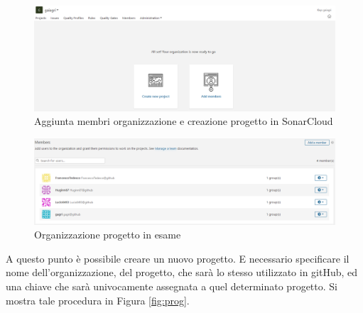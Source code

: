 \begin{figure}[htbp]
	\centering
	\includegraphics[scale=0.5, trim = 0cm 0cm 0cm 0cm, clip=true]{figSonarCloud/aggiuntaMembri.PNG}
	\caption{Aggiunta membri organizzazione e creazione progetto in SonarCloud}
	\label{fig:membri}
\end{figure}

\begin{figure}[htbp]
	\centering
	\includegraphics[scale=0.5, trim = 0cm 0cm 0cm 0cm, clip=true]{figSonarCloud/nostraOrganizzazione.PNG}
	\caption{Organizzazione progetto in esame}
	\label{fig:nostraOrg}
\end{figure}
A questo punto è possibile creare un nuovo progetto. E necessario specificare il nome dell'organizzazione, del progetto, che sarà lo stesso utilizzato in gitHub, ed una chiave che sarà univocamente assegnata a quel determinato progetto. Si mostra tale procedura in Figura \ref{fig:prog}.

